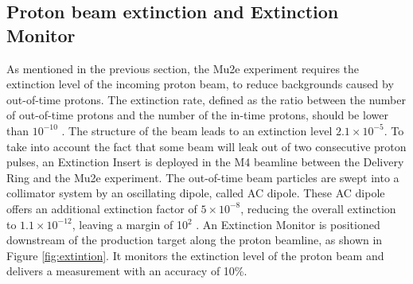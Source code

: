 \subsection{Proton beam extinction and Extinction Monitor}
As mentioned in the previous section, the Mu2e experiment 
requires the extinction level of the incoming proton beam, to reduce backgrounds caused by out-of-time protons. 
The extinction rate, defined as the ratio between the 
number of out-of-time protons and the number of the in-time protons, should be lower than $10^{-10}$ \cite{bartoszek2015mu2e}. The structure of the beam 
leads to an extinction level $2.1 \times 10^{-5}$. To take into account the fact that some beam will 
leak out of two consecutive proton pulses, an Extinction 
Insert is deployed in the M4 beamline between the Delivery Ring and the Mu2e experiment.
The out-of-time beam particles are swept into a collimator system by an oscillating dipole, called AC dipole. These AC dipole 
offers an additional 
extinction factor of $5\times 10^{-8}$, reducing the 
overall extinction to $1.1 \times 10^{-12}$, leaving a margin of 10$^2$ \cite{accelerator}. An 
Extinction Monitor is positioned downstream of the 
production target along the proton beamline, as shown in Figure \ref{fig:extintion}. It monitors the 
extinction level of the proton beam and delivers a measurement with an accuracy of 10\%.

